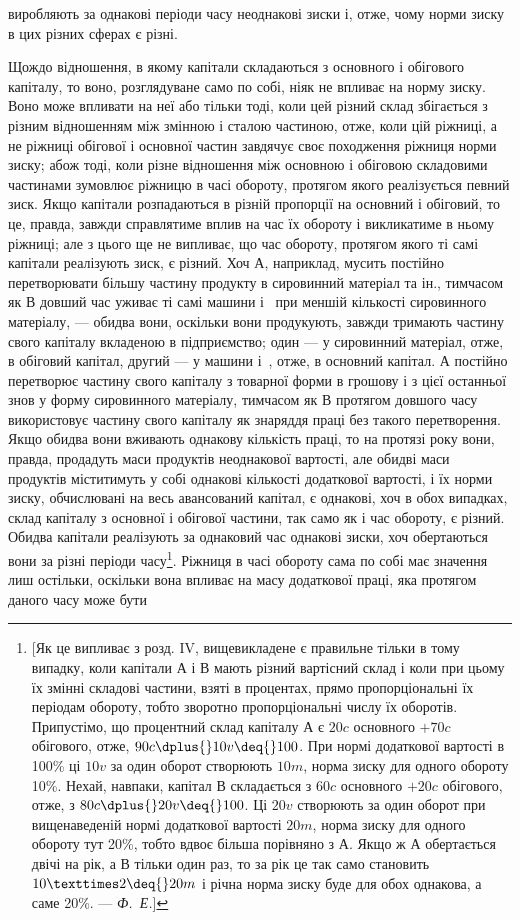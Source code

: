 \parcont{}  %
виробляють за однакові періоди часу неоднакові зиски і, отже,
чому норми зиску в цих різних сферах є різні.

Щождо відношення, в якому капітали складаються з основного і обігового капіталу, то воно,
розглядуване само по собі, ніяк не впливає на норму зиску. Воно може впливати на неї або тільки
тоді, коли цей різний склад збігається з різним відношенням між змінною і сталою частиною, отже,
коли цій ріжниці, а не ріжниці обігової і основної частин завдячує своє походження ріжниця норми
зиску; абож тоді, коли різне відношення між основною і обіговою складовими частинами зумовлює
ріжницю в часі обороту, протягом якого реалізується певний зиск. Якщо капітали розпадаються в різній
пропорції на основний і обіговий, то це, правда, завжди справлятиме вплив
на час їх обороту і викликатиме в ньому ріжниці; але з цього
ще не випливає, що час обороту, протягом якого ті самі капітали реалізують зиск, є різний. Хоч $А$,
наприклад, мусить постійно перетворювати більшу частину продукту в сировинний матеріал та ін.,
тимчасом як $В$ довший час уживає ті самі
машини і~ при меншій кількості сировинного матеріалу, — обидва вони, оскільки вони продукують,
завжди тримають
частину свого капіталу вкладеною в підприємство; один — у сировинний матеріал, отже, в обіговий
капітал, другий — у машини
і~, отже, в основний капітал. $А$ постійно перетворює частину свого капіталу з товарної форми в
грошову і з цієї останньої знов у форму сировинного матеріалу, тимчасом як $В$ протягом довшого часу
використовує частину свого капіталу як
знаряддя праці без такого перетворення. Якщо обидва вони
вживають однакову кількість праці, то на протязі року вони,
правда, продадуть маси продуктів неоднакової вартості, але
обидві маси продуктів міститимуть у собі однакові кількості
додаткової вартості, і їх норми зиску, обчислювані на весь авансований капітал, є однакові, хоч в
обох випадках, склад капіталу з
основної і обігової частини, так само як і час обороту, є різний.
Обидва капітали реалізують за однаковий час однакові зиски, хоч
обертаються вони за різні періоди часу\footnote{
[Як це випливає з розд. IV, вищевикладене є правильне тільки в тому
випадку, коли капітали $А$ і $В$ мають різний вартісний склад і коли при цьому
їх змінні складові частини, взяті в процентах, прямо пропорціональні їх періодам обороту, тобто
зворотно пропорціональні числу їх оборотів. Припустімо,
що процентний склад капіталу $А$ є $20 c$ основного $+70 c$ обігового, отже,
$90 c \dplus{} 10 v \deq{} 100$. При нормі додаткової вартості в 100\% ці $10 v$ за один оборот створюють $10 m$, норма
зиску для одного обороту \deq{} 10\%. Нехай, навпаки, капітал $В$ складається з $60 c$ основного $+20 c$
обігового, отже, з $80 c \dplus{} 20 v \deq{} 100$.
Ці $20 v$ створюють за один оборот при вищенаведеній нормі додаткової вартості $20 m$, норма зиску для
одного обороту тут \deq{} 20\%, тобто вдвоє більша
порівняно з $А$. Якщо ж $А$ обертається двічі на рік, а $В$ тільки один раз, то за
рік це так само становить $10 × 2 \deq{} 20 m$ і річна норма зиску буде для обох
однакова, а саме 20\%. — \emph{Ф.~Е.}]
}. Ріжниця в часі обороту
сама по собі має значення лиш остільки, оскільки вона впливає
на масу додаткової праці, яка протягом даного часу може бути
\parbreak{}  %
